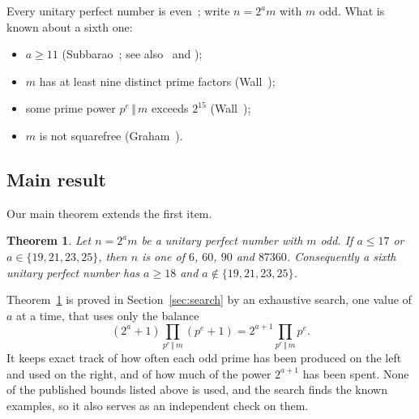 \documentclass[11pt]{amsart}
\theoremstyle{plain}
\newtheorem{theorem}{Theorem}
\theoremstyle{definition}
\newcommand{\RESULTtheorem}{Let $n=2^am$ be a unitary perfect number with $m$ odd.  If $a\le 17$ or $a\in\{19, 21, 23, 25\}$, then $n$ is one of $6$, $60$, $90$ and $87360$.  Consequently a sixth unitary perfect number has $a\ge 18$ and $a\notin\{19, 21, 23, 25\}$.}
\begin{document}
Every unitary perfect number is even~\cite{SW1966}; write $n=2^am$ with
$m$ odd.  What is known about a sixth one:
\begin{itemize}[leftmargin=*]
\item $a\ge 11$ (Subbarao~\cite{Subbarao1970}; see also~\cite{SCNW1972} and
\cite{Wall1987,Wall1988});
\item $m$ has at least nine distinct prime factors (Wall~\cite{Wall1988});
\item some prime power $p^e\,\Vert\,m$ exceeds $2^{15}$ (Wall~\cite{Wall1987});
\item $m$ is not squarefree (Graham~\cite{Graham1989}).
\end{itemize}

\subsection*{Main result}
Our main theorem extends the first item.

\begin{theorem}\label{thm:intro}
\RESULTtheorem{}
\end{theorem}

Theorem~\ref{thm:intro} is proved in Section~\ref{sec:search} by an exhaustive
search, one value of $a$ at a time, that uses only the balance
\begin{equation}\label{eq:ast}
(2^a+1)\prod_{p^e\,\Vert\, m}(p^e+1)=2^{a+1}\prod_{p^e\,\Vert\, m}p^e .
\end{equation}
It keeps exact track of how often each odd prime has been produced on the left
and used on the right, and of how much of the power $2^{a+1}$ has been spent.
None of the published bounds listed above is used, and the search finds the
known examples, so it also serves as an independent check on them.
\end{document}
